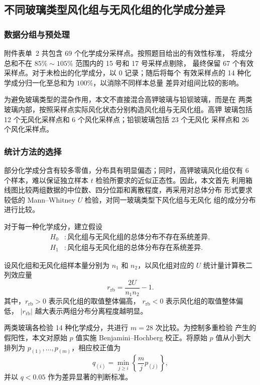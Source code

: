\documentclass[UTF8,a4paper,12pt,fontset=fandol]{ctexart}
\begin{document}
\subsection{不同玻璃类型风化组与无风化组的化学成分差异}

\subsubsection{数据分组与预处理}

附件表单~2 共包含 69 个化学成分采样点。按照题目给出的有效性标准，
将成分总和不在 $85\%\sim105\%$ 范围内的 15 号和 17 号采样点剔除，
最终保留 67 个有效采样点。对于未检出的化学成分，以 0 记录；随后将每个
有效采样点的 14 种化学成分归一化至总和为 $100\%$，以消除不同样本总量
差异对组间比较的影响。

为避免玻璃类型的混杂作用，本文不直接混合高钾玻璃与铅钡玻璃，而是在
两类玻璃内部，按照采样点实际风化状态分别构造风化组与无风化组。高钾
玻璃包括 12 个无风化采样点和 6 个风化采样点；铅钡玻璃包括 23 个无风化
采样点和 26 个风化采样点。

\subsubsection{统计方法的选择}

部分化学成分含有较多零值，分布具有明显偏态；同时，高钾玻璃风化组仅有
6 个样本，难以保证独立样本 $t$ 检验所要求的近似正态性。因此，本文首先
利用箱线图比较两组数据的中位数、四分位距和离散程度，再采用对总体分布
形式要求较低的 Mann--Whitney $U$ 检验，对同一玻璃类型下风化组与无风化
组的成分分布进行比较。

对于每一种化学成分，建立假设
\begin{equation}
    \begin{aligned}
        H_0 &: \text{风化组与无风化组的总体分布不存在系统差异},\\
        H_1 &: \text{风化组与无风化组的总体分布存在系统差异}.
    \end{aligned}
\end{equation}

设风化组和无风化组样本量分别为 $n_1$ 和 $n_2$，以风化组对应的
$U$ 统计量计算秩二列效应量
\begin{equation}
    r_{\mathrm{rb}}=\frac{2U}{n_1n_2}-1.
\end{equation}
其中，$r_{\mathrm{rb}}>0$ 表示风化组的取值整体偏高，
$r_{\mathrm{rb}}<0$ 表示风化组的取值整体偏低，
$|r_{\mathrm{rb}}|$ 越大表示两组分布分离程度越明显。

两类玻璃各检验 14 种化学成分，共进行 $m=28$ 次比较。为控制多重检验
产生的假阳性，本文对原始 $p$ 值实施 Benjamini--Hochberg 校正。将原始
$p$ 值从小到大排列为 $p_{(1)},\ldots,p_{(m)}$，相应校正值为
\begin{equation}
    q_{(i)}=\min_{j\geq i}\left\{\frac{m}{j}p_{(j)}\right\},
\end{equation}
并以 $q<0.05$ 作为差异显著的判断标准。
\end{document}

